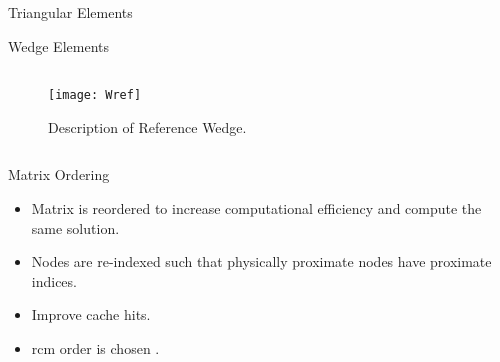 \begin{frame}{Triangular Elements}
  \begin{figure}
    \centering
    \vspace{0.2in}
    \label{fig:triangle_elements}
  \end{figure}
\end{frame}

\begin{frame}{Wedge Elements}
  \begin{columns}
    \begin{column}{0.5\textwidth}
      \vspace*{\fill}
      \begin{figure}
        \centering
        \texttt{[image: Wref]}
        \caption{Description of Reference Wedge.}
        \label{fig:Wref}
      \end{figure}
      \vspace*{\fill}
    \end{column}
    \begin{column}{0.5\textwidth}
      \begin{figure}
        \centering
        \hspace{0.1\textwidth}
        \label{fig:sketch_wedge}
      \end{figure}
    \end{column}
  \end{columns}
\end{frame}

\begin{frame}{Matrix Ordering}
  \begin{itemize}
    \item Matrix is reordered to increase computational efficiency and compute
      the same solution.
    \item Nodes are re-indexed such that physically proximate nodes have
      proximate indices.
    \item Improve cache hits.
    \item \gls{rcm} order is chosen \cite{rcm}.
  \end{itemize}
  \vspace{-0.25in}
  \begin{figure}
    \centering
    \hspace{0.1in}
    \label{fig:sparsity_pattern}
  \end{figure}
\end{frame}

